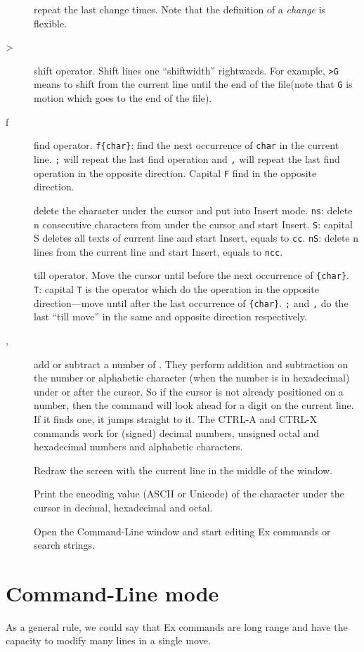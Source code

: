 \documentclass{article}
\newcommand{\syntax}[1]{\PVerb{#1}}
\newcommand{\dq}[1]{``#1''}
\begin{document}
\begin{description}
\item[\syntax{[count].}] repeat the last change \syntax{[count]} times. Note that the definition of a \emph{change} is flexible.
\item[>] shift operator. Shift lines one ``shiftwidth'' rightwards. For example, \verb|>G| means to shift from the current line until the end of the file(note that \texttt{G} is motion which goes to the end of the file).
\item[f] find operator. \verb|f{char}|: find the next occurrence of \texttt{char} in the current line. \verb|;| will repeat the last find operation and \verb|,| will repeat the last find operation in the opposite direction. Capital \texttt{F} find in the opposite direction. 
\item[\syntax{s}] delete the character under the cursor and put into Insert mode. \texttt{ns}: delete n consecutive characters from under the cursor and start Insert. \texttt{S}: capital S deletes all texts of current line and start Insert, equals to \verb|cc|. \texttt{nS}: delete n lines from the current line and start Insert, equals to \verb|ncc|.
\item[\syntax{t}] till operator. Move the cursor until before the next occurrence of \verb|{char}|. \texttt{T}: capital \verb|T| is the operator which do the operation in the opposite direction---move until after the last occurrence of \verb|{char}|. \verb|;| and \verb|,| do the last \dq{till move} in the same and opposite direction respectively.
\item[\syntax{<C-a>}, \syntax{<C-x>}] add or subtract a number of \syntax{[count]}. They perform addition and subtraction on the number or alphabetic character (when the number is in hexadecimal) under or after the cursor. So if the cursor is not already positioned on a number, then the command will look ahead for a digit on the current line. If it finds one, it jumps straight to it. The CTRL-A and CTRL-X commands work for (signed) decimal numbers, unsigned octal and hexadecimal numbers and alphabetic characters.
\item[\syntax{zz}] Redraw the screen with the current line in the middle of the window.
\item[\syntax{ga}] Print the encoding value (ASCII or Unicode) of the character under the cursor in decimal, hexadecimal and octal.
\item[\syntax{q:,q/,q?}] Open the Command-Line window and start editing Ex commands or search strings.
\end{description}
\part{Command-Line mode}
As a general rule, we could say that Ex commands are long range and have the capacity to modify many lines in a single move.
\end{document}
